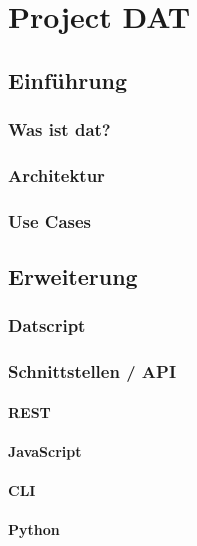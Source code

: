 \part{Project DAT}

\chapter{Einführung}

\section{Was ist dat?}

\section{Architektur}

\section{Use Cases}

\chapter{Erweiterung}

\section{Datscript}


\section{Schnittstellen / API}

\subsection{REST}

\subsection{JavaScript}

\subsection{CLI}

\subsection{Python}
